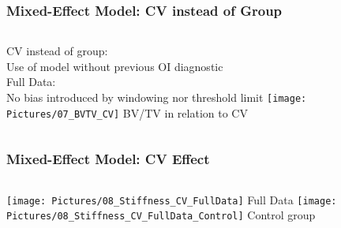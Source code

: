 \documentclass[xcolor=table]{beamer}
\begin{document}
\begin{frame}
	\frametitle{Mixed-Effect Model: CV instead of Group}
	\begin{columns}[c]
		CV instead of group:\\Use of model without previous OI diagnostic
		\\\vspace{1em}
		Full Data:\\No bias introduced by windowing nor threshold limit
		\centering
		\vfill
		\texttt{[image: Pictures/07\_BVTV\_CV]}
		BV/TV in relation to CV
		\vfill
	\end{columns}
\end{frame}


\begin{frame}
	\frametitle{Mixed-Effect Model: CV Effect}
	\begin{columns}[c]
		\centering
		\vfill
		\texttt{[image: Pictures/08\_Stiffness\_CV\_FullData]}
		Full Data
		\vfill
		\centering
		\vfill
		\texttt{[image: Pictures/08\_Stiffness\_CV\_FullData\_Control]}
		Control group
		\vfill
	\end{columns}
\end{frame}

\end{document}
